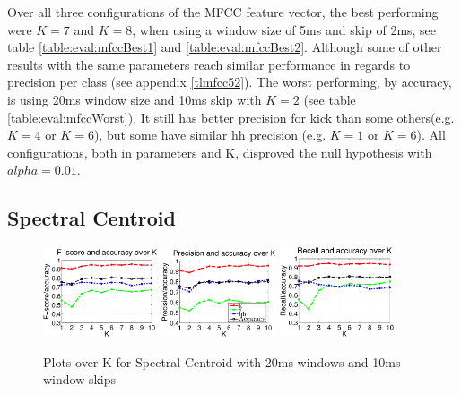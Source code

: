 		Over all three configurations of the MFCC feature vector, the best performing were $K=7$ and $K=8$, when using a window size of 5ms and skip of 2ms, see table \ref{table:eval:mfccBest1} and \ref{table:eval:mfccBest2}. Although some of other results with the same parameters reach similar performance in regards to precision per class (see appendix \ref{tlmfcc52}). The worst performing, by accuracy, is using 20ms window size and 10ms skip with $K=2$ (see table \ref{table:eval:mfccWorst}). It still has better precision for kick than some others(e.g. $K=4$ or $K=6$), but some have similar hh precision (e.g. $K=1$ or $K=6$). All configurations, both in parameters and K, disproved the null hypothesis with $alpha=0.01$.
		
		
	\subsection{Spectral Centroid}
		\begin{figure}
			\centering\includegraphics[width=0.3\textwidth]{tex/appendices/test/scentroid2010FP.png}
			\centering\includegraphics[width=0.3\textwidth]{tex/appendices/test/scentroid2010_P.png}
			\centering\includegraphics[width=0.3\textwidth]{tex/appendices/test/scentroid2010_R.png}
			
			\caption{Plots over K for Spectral Centroid with 20ms windows and 10ms window skips}
		\end{figure}
